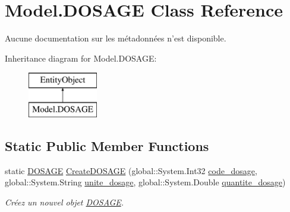 \hypertarget{class_model_1_1_d_o_s_a_g_e}{\section{Model.\-D\-O\-S\-A\-G\-E Class Reference}
\label{class_model_1_1_d_o_s_a_g_e}
}


Aucune documentation sur les métadonnées n'est disponible.  


Inheritance diagram for Model.\-D\-O\-S\-A\-G\-E\-:\begin{figure}[H]
\begin{center}
\leavevmode
\includegraphics[height=2.000000cm]{class_model_1_1_d_o_s_a_g_e}
\end{center}
\end{figure}
\subsection*{Static Public Member Functions}
\begin{DoxyCompactItemize}
\item 
static \hyperlink{class_model_1_1_d_o_s_a_g_e}{D\-O\-S\-A\-G\-E} \hyperlink{class_model_1_1_d_o_s_a_g_e_ae142d476b20c913dde135f3e65fce332}{Create\-D\-O\-S\-A\-G\-E} (global\-::\-System.\-Int32 \hyperlink{class_model_1_1_d_o_s_a_g_e_af32ad785d5d3cdf43390c6a6f02d078a}{code\-\_\-dosage}, global\-::\-System.\-String \hyperlink{class_model_1_1_d_o_s_a_g_e_a3404cd2f5d068ae264fd6848e4baf4e5}{unite\-\_\-dosage}, global\-::\-System.\-Double \hyperlink{class_model_1_1_d_o_s_a_g_e_ac3bf6f580f1ebe8e492def33d2b8bcbc}{quantite\-\_\-dosage})
\begin{DoxyCompactList}\small\item\em Créez un nouvel objet \hyperlink{class_model_1_1_d_o_s_a_g_e}{D\-O\-S\-A\-G\-E}. \end{DoxyCompactList}\end{DoxyCompactItemize}
